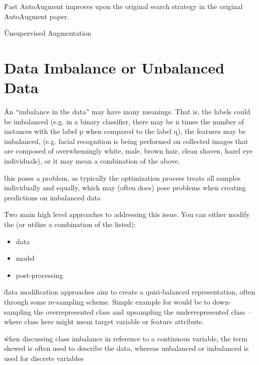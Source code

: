 \r{Fast AutoAugment\cite{lim2019fast} improves upon the original search strategy in the original AutoAugment paper.}

\r{Unsupervised Augmentation}


\section{Data Imbalance or Unbalanced Data}
\label{app_data_imbalance}




\r{An ``imbalance in the data'' may have many meanings. That is, the labels could be imbalanced (e.g. in a binary classifier, there may be n times the number of instances with the label p when compared to the label q), the features may be imbalanced, (e.g. facial recognition is being performed on collected images that are composed of overwhemingly white, male, brown hair, clean shaven, hazel eye individuals), or it may mean a combination of the above.}

\r{this poses a problem, as typically the optimization process treats all samples individually and equally, which may (often does) pose problems when creating predictions on imbalanced data}

\r{Two main high level approaches to addressing this issue. You can either modify the (or utilize a combination of the listed):}
\begin{itemize}[noitemsep,topsep=0pt]
	\item data
	\item model
	\item post-processing
\end{itemize}

\r{data modification approaches aim to create a quisi-balanced representation, often through some re-sampling scheme. Simple example for would be to down-sampling the overrepresented class and upsampling the underrepresented class -- where class here might mean target variable or feature attribute.}

\r{when discussing class imbalance in reference to a continuous variable, the term skewed is often used to describe the data, whereas unbalanced or imbalanced is used for discrete variables}

